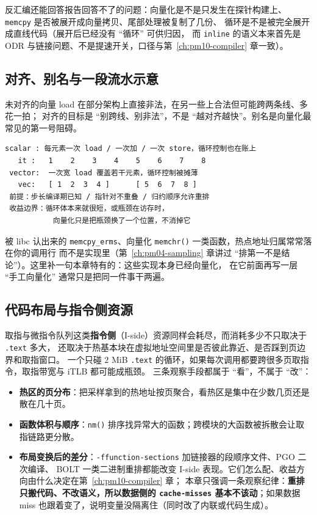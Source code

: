 \documentclass[12pt,a4paper,fontset=fandol]{ctexbook}
\newcommand{\Fn}[1]{\texttt{#1()}}
\newcommand{\Tp}[1]{\texttt{#1}}
\newcommand{\Bk}{\discretionary{}{}{}}
\newcommand{\Mx}[1]{\textsf{#1}}
\begin{document}
反汇编还能回答报告回答不了的问题：向量化是不是只发生在探针构建上、
\Tp{memcpy} 是否被展开成向量拷贝、尾部处理被复制了几份、
循环是不是被完全展开成直线代码（展开后已经没有 ``循环'' 可供归因，
而 \Tp{inline} 的语义本来首先是 ODR 与链接问题、不是提速开关，口径与第~\ref{ch:pm10-compiler} 章一致）。

\subsection{对齐、别名与一段流水示意}

未对齐的向量 load 在部分架构上直接非法，在另一些上合法但可能跨两条线、多花一拍；
对齐的目标是 ``别跨线、别非法''，不是 ``越对齐越快''。别名是向量化最常见的第一号阻碍。

\begin{lstlisting}[style=outstyle,caption={循环被向量化后的形态示意（概念图，非实测数据）},label={lst:pm06-pipe}]
 scalar : 每元素一次 load / 一次加 / 一次 store，循环控制也在账上
   it :   1    2    3    4    5    6    7    8
 vector:  一次宽 load 覆盖若干元素，循环控制被摊薄
   vec:   [ 1  2  3  4 ]      [ 5  6  7  8 ]
 前提：步长编译期已知 / 指针对不重叠 / 归约顺序允许重排
 收益边界：循环体本来就很短，或瓶颈在访存时，
           向量化只是把瓶颈换了一个位置，不消掉它
\end{lstlisting}

被 libc 认出来的 \Tp{memcpy{\Bk}\_erms}、向量化 \Fn{memchr} 一类函数，热点地址归属常常落在你的调用行
而不是实现里（第~\ref{ch:pm04-sampling} 章讲过 ``排第一不是结论''）。这里补一句本章特有的：这些实现本身已经向量化，
在它前面再写一层 ``手工向量化'' 通常只是把同一件事干两遍。

\subsection{代码布局与指令侧资源}

取指与微指令队列这类\textbf{指令侧}（I-side）资源同样会耗尽，而消耗多少不只取决于 \Tp{.text} 多大，
还取决于热基本块在虚拟地址空间里是否彼此靠近、是否踩到页边界和取指窗口。
一个只碰 $2$ MiB \Tp{.text} 的循环，如果每次调用都要跨很多页取指令，取指带宽与 \Mx{iTLB} 都可能成瓶颈。
三条观察手段都属于 ``看''，不属于 ``改''：
\begin{itemize}
\item \textbf{热区的页分布}：把采样拿到的热地址按页聚合，看热区是集中在少数几页还是散在几十页。
\item \textbf{函数体积与顺序}：\Fn{nm} 排序找异常大的函数；跨模块的大函数被拆散会让取指链路更分散。
\item \textbf{布局变换后的差分}：\Tp{-ffunction{\Bk}-sections} 加链接器的段顺序文件、PGO 二次编译、
  BOLT 一类二进制重排都能改变 I-side 表现。它们怎么配、收益方向由什么决定在第~\ref{ch:pm10-compiler} 章；
  本章只强调一条观察纪律：\textbf{重排只搬代码、不改语义，所以数据侧的 \Tp{cache{\Bk}-misses}
  基本不该动}；如果数据 miss 也跟着变了，说明变量没隔离住（同时改了内联或代码生成）。
\end{itemize}
\end{document}
